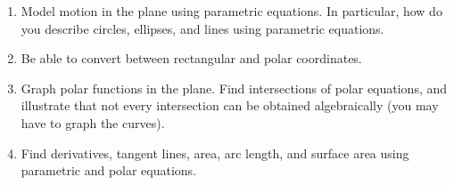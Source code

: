 
\begin{enumerate}

\item Model motion in the plane using parametric equations. In particular, how do you describe circles, ellipses, and lines using parametric equations.
\item Be able to convert between rectangular and polar coordinates. 
\item Graph polar functions in the plane. Find intersections of polar equations, and illustrate that not every intersection can be obtained algebraically (you may have to graph the curves).
\item Find derivatives, tangent lines, area, arc length, and surface area using parametric and polar equations.

\end{enumerate}


